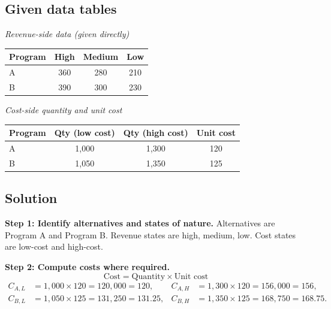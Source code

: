 \begin{ExamProblems}
		\subsection*{Given data tables}
		\begin{center}
			\begin{minipage}[t]{0.48\linewidth}
				\textit{Revenue-side data (given directly)}
				\begin{center}
					\begin{tabular}{l c c c}
						\toprule
						Program & High & Medium & Low \\
						\midrule
						A & 360 & 280 & 210 \\
						B & 390 & 300 & 230 \\
						\bottomrule
					\end{tabular}
				\end{center}
			\end{minipage}
			\hfill
			\begin{minipage}[t]{0.48\linewidth}
				\textit{Cost-side quantity and unit cost}
				\begin{center}
					\begin{tabular}{l c c c}
						\toprule
						Program & Qty (low cost) & Qty (high cost) & Unit cost \\
						\midrule
						A & 1{,}000 & 1{,}300 & 120 \\
						B & 1{,}050 & 1{,}350 & 125 \\
						\bottomrule
					\end{tabular}
				\end{center}
			\end{minipage}
		\end{center}
		
		\subsection*{Solution}
		\textbf{Step 1: Identify alternatives and states of nature.} Alternatives are Program A and Program B. Revenue states are high, medium, low. Cost states are low-cost and high-cost.
		
		\textbf{Step 2: Compute costs where required.}
		\[
		\text{Cost} = \text{Quantity} \times \text{Unit cost}
		\]
		\[
		\begin{aligned}
		C_{A,L} &= 1{,}000\times120 = 120{,}000 = 120, & C_{A,H} &= 1{,}300\times120 = 156{,}000 = 156,\\
		C_{B,L} &= 1{,}050\times125 = 131{,}250 = 131.25, & C_{B,H} &= 1{,}350\times125 = 168{,}750 = 168.75.
		\end{aligned}
		\]
		

\end{ExamProblems}
